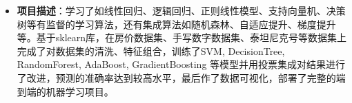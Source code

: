 \documentclass{resume}
\begin{document}
\begin{itemize}

\item {}
\textbf{项目描述}：学习了如线性回归、逻辑回归、正则线性模型、支持向量机、决策树等有监督的学习算法，还有集成算法如随机森林、自适应提升、梯度提升等。基于sklearn库，在房价数据集、手写数字数据集、泰坦尼克号等数据集上完成了对数据集的清洗、特征组合，训练了SVM, DecisionTree, RandomForest, AdaBoost, GradientBoosting 等模型并用投票集成对结果进行了改进，预测的准确率达到较高水平，最后作了数据可视化，部署了完整的端到端的机器学习项目。
\end{itemize}
\end{document}
